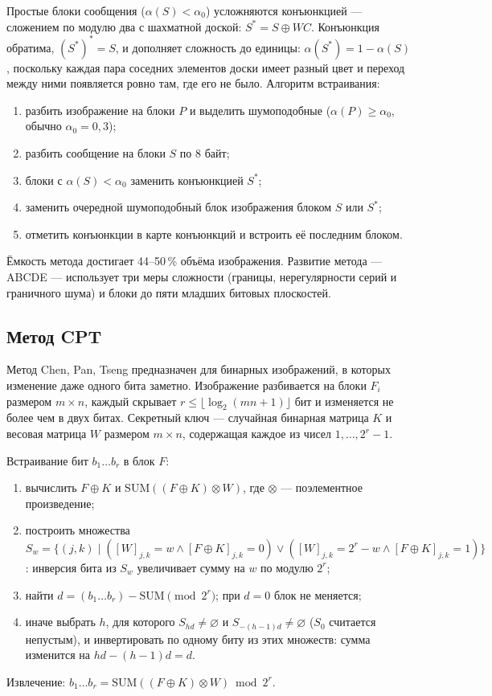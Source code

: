 \documentclass[14pt,a4paper]{extarticle}
\begin{document}
Простые блоки сообщения ($\alpha(S) < \alpha_0$) усложняются конъюнкцией ---
сложением по модулю два с шахматной доской: $S^* = S \oplus WC$. Конъюнкция обратима,
$(S^*)^* = S$, и дополняет сложность до единицы: $\alpha(S^*) = 1 - \alpha(S)$,
поскольку каждая пара соседних элементов доски имеет разный цвет и переход между ними
появляется ровно там, где его не было. Алгоритм встраивания:
\begin{enumerate}
\item разбить изображение на блоки $P$ и выделить шумоподобные ($\alpha(P) \ge
\alpha_0$, обычно $\alpha_0 = 0{,}3$);
\item разбить сообщение на блоки $S$ по 8 байт;
\item блоки с $\alpha(S) < \alpha_0$ заменить конъюнкцией $S^*$;
\item заменить очередной шумоподобный блок изображения блоком $S$ или $S^*$;
\item отметить конъюнкции в карте конъюнкций и встроить её последним блоком.
\end{enumerate}
Ёмкость метода достигает 44--50\,\% объёма изображения. Развитие метода --- ABCDE ---
использует три меры сложности (границы, нерегулярности серий и граничного шума) и
блоки до пяти младших битовых плоскостей.

\subsection{Метод CPT}

Метод Chen, Pan, Tseng предназначен для бинарных изображений, в которых изменение даже
одного бита заметно. Изображение разбивается на блоки $F_i$ размером $m \times n$,
каждый скрывает $r \le \lfloor \log_2(mn + 1) \rfloor$ бит и изменяется не более чем в
двух битах. Секретный ключ --- случайная бинарная матрица $K$ и весовая матрица $W$
размером $m \times n$, содержащая каждое из чисел $1, \ldots, 2^r - 1$.

Встраивание бит $b_1 \ldots b_r$ в блок $F$:
\begin{enumerate}
\item вычислить $F \oplus K$ и $\mathrm{SUM}((F \oplus K) \otimes W)$, где $\otimes$ ---
поэлементное произведение;
\item построить множества $S_w = \{(j, k) \mid ([W]_{j,k} = w \wedge [F \oplus K]_{j,k}
= 0) \vee ([W]_{j,k} = 2^r - w \wedge [F \oplus K]_{j,k} = 1)\}$: инверсия бита из
$S_w$ увеличивает сумму на $w$ по модулю $2^r$;
\item найти $d = (b_1 \ldots b_r) - \mathrm{SUM} \pmod{2^r}$; при $d = 0$ блок не
меняется;
\item иначе выбрать $h$, для которого $S_{hd} \ne \varnothing$ и $S_{-(h-1)d} \ne
\varnothing$ ($S_0$ считается непустым), и инвертировать по одному биту из этих
множеств: сумма изменится на $hd - (h - 1)d = d$.
\end{enumerate}
Извлечение: $b_1 \ldots b_r = \mathrm{SUM}((F \oplus K) \otimes W) \bmod 2^r$.
\end{document}
